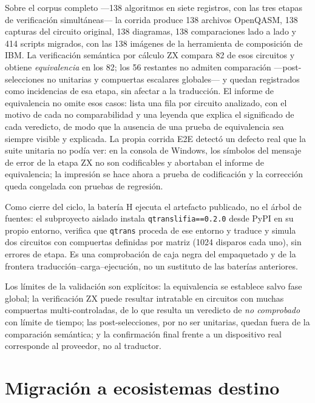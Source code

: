 \documentclass[11pt,a4paper]{article}
\newcommand{\code}[1]{\texttt{#1}}
\begin{document}
Sobre el corpus completo ---138 algoritmos en siete registros, con las tres etapas de
verificación simultáneas--- la corrida produce 138 archivos OpenQASM, 138 capturas del
circuito original, 138 diagramas, 138 comparaciones lado a lado y 414 scripts migrados, con
las 138 imágenes de la herramienta de composición de IBM. La verificación semántica por
cálculo ZX compara 82 de esos circuitos y obtiene \emph{equivalencia} en los 82; los 56
restantes no admiten comparación ---post-selecciones no unitarias y compuertas escalares
globales--- y quedan registrados como incidencias de esa
etapa, sin afectar a la traducción. El informe de equivalencia no omite esos casos: lista
una fila por circuito analizado, con el motivo de cada no comparabilidad y una leyenda que
explica el significado de cada veredicto, de modo que la ausencia de una prueba de
equivalencia sea siempre visible y explicada. La propia corrida E2E detectó un defecto real
que la suite unitaria no podía ver: en la consola de Windows, los símbolos del mensaje de
error de la etapa ZX no son codificables y abortaban el informe de equivalencia; la
impresión se hace ahora a prueba de codificación y la corrección queda congelada con
pruebas de regresión.

Como cierre del ciclo, la batería H ejecuta el artefacto publicado, no el árbol de fuentes:
el subproyecto aislado instala \code{qtranslifia==0.2.0} desde PyPI en su propio entorno,
verifica que \code{qtrans} proceda de ese entorno y traduce y simula dos circuitos con
compuertas definidas por matriz (1024 disparos cada uno), sin errores de etapa. Es una
comprobación de caja negra del empaquetado y de la frontera traducción--carga--ejecución,
no un sustituto de las baterías anteriores.

Los límites de la validación son explícitos: la equivalencia se establece salvo fase global;
la verificación ZX puede resultar intratable en circuitos con muchas compuertas
multi-controladas, de lo que resulta un veredicto de \emph{no comprobado} con límite de
tiempo; las post-selecciones, por no ser unitarias, quedan fuera de la comparación
semántica; y la confirmación final frente a un dispositivo real corresponde al proveedor, no
al traductor.


\section{Migración a ecosistemas destino}
\label{sec:migracion}
\end{document}
